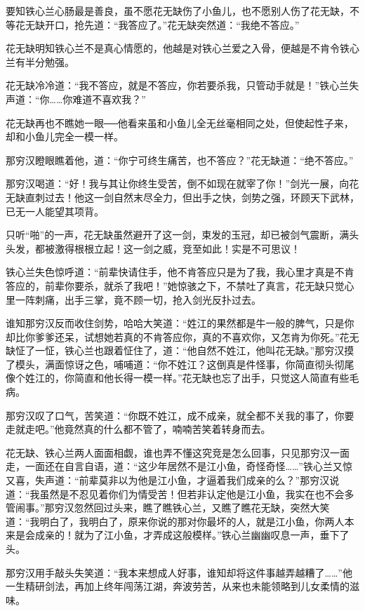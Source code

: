 \documentclass[12pt,oneside]{book}
\begin{document}
要知铁心兰心肠最是善良，虽不愿花无缺伤了小鱼儿，也不愿别人伤了花无缺，不等花无缺开口，抢先道：``我答应了。''花无缺突然道：``我绝不答应。''

花无缺明知铁心兰不是真心情愿的，他越是对铁心兰爱之入骨，便越是不肯令铁心兰有半分勉强。

花无缺冷冷道：``我不答应，就是不答应，你若要杀我，只管动手就是！''铁心兰失声道：``你\ldots\ldots 你难道不喜欢我？''

花无缺再也不瞧她一眼──他看来虽和小鱼儿全无丝毫相同之处，但使起性子来，却和小鱼儿完全一模一样。

那穷汉瞪眼瞧着他，道：``你宁可终生痛苦，也不答应？''花无缺道：``绝不答应。''

那穷汉喝道：``好！我与其让你终生受苦，倒不如现在就宰了你！''剑光一展，向花无缺直刺过去！他这一剑自然末尽全力，但出手之快，剑势之强，环顾天下武林，已无一人能望其项背。

只听``啪''的一声，花无缺虽然避开了这一剑，束发的玉冠，却已被剑气震断，满头头发，都被激得根根立起！这一剑之威，竞至如此！实是不可思议！

铁心兰失色惊呼道：``前辈快请住手，他不肯答应只是为了我，我心里才真是不肯答应的，前辈你要杀，就杀了我吧！''她惊骇之下，不禁吐了真言，花无缺只觉心里一阵刺痛，出手三掌，竟不顾一切，抢入剑光反扑过去。

谁知那穷汉反而收住剑势，哈哈大笑道：``姓江的果然都是牛一般的脾气，只是你却比你爹爹还呆，试想她若真的不肯答应你，真的不喜欢你，又怎肯为你死。''花无缺怔了一怔，铁心兰也跟着怔住了，道：``他自然不姓江，他叫花无缺。''那穷汉摸了模头，满面惊讶之色，哺哺道：``你不姓江？这倒真是件怪事，你简直彻头彻尾像个姓江的，你简直和他长得一模一样。''花无缺也忘了出手，只觉这人简直有些毛病。

那穷汉叹了口气，苦笑道：``你既不姓江，成不成亲，就全都不关我的事了，你要走就走吧。''他竟然真的什么都不管了，喃喃苦笑着转身而去。

花无缺、铁心兰两人面面相觑，谁也弄不懂这究竞是怎么回事，只见那穷汉一面走，一面还在自言自语，道：``这少年居然不是江小鱼，奇怪奇怪\ldots\ldots{}''铁心兰又惊又喜，失声道：``前辈莫非以为他是江小鱼，才逼着我们成亲的么？''那穷汉说道：``我虽然是不忍见着你们为情受苦！但若非认定他是江小鱼，我实在也不会多管闹事。''那穷汉忽然回过头来，瞧了瞧铁心兰，又瞧了瞧花无缺，突然大笑道：``我明白了，我明白了，原来你说的那对你最坏的人，就是江小鱼，你两人本来是会成亲的！就为了江小鱼，才弄成这般模样。''铁心兰幽幽叹息一声，垂下了头。

那穷汉用手敲头失笑道：``我本来想成人好事，谁知却将这件事越弄越糟了\ldots\ldots{}''他一生精研剑法，再加上终年闯荡江湖，奔波劳苦，从来也未能领略到儿女柔情的滋味。
\end{document}
